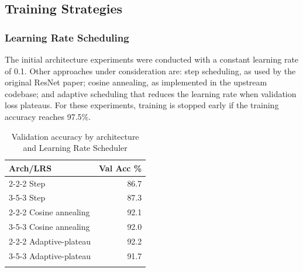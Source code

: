 \documentclass[letterpaper]{article} %
\begin{document}
\subsection{Training Strategies}

\subsubsection{Learning Rate Scheduling}

The initial architecture experiments were conducted with a constant learning rate of 0.1.
Other approaches under consideration are: step scheduling, as used by the original ResNet paper;
cosine annealing, as implemented in the upstream codebase; and adaptive scheduling that reduces the learning rate
when validation loss plateaus.
For these experiments, training is stopped early if the training accuracy reaches 97.5\%.

\begin{table}[b]
\centering
\begin{tabular}{|l|r|}
    \firsthline
    Arch/LRS & Val Acc \%    \\
    \hline
    2-2-2 Step & 86.7    \\
    3-5-3 Step & 87.3    \\
    2-2-2 Cosine annealing & 92.1    \\
    3-5-3 Cosine annealing & 92.0    \\
    2-2-2 Adaptive-plateau & 92.2    \\
    3-5-3 Adaptive-plateau & 91.7    \\
    \lasthline
\end{tabular}
\caption{Validation accuracy by architecture and Learning Rate Scheduler}
\label{table2}
\end{table}
\end{document}

